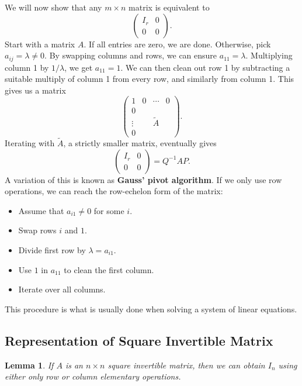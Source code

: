 \documentclass[12pt]{article}
\newtheorem{lemma}{Lemma}[section]
\theoremstyle{definition}
\theoremstyle{remark}
\begin{document}
We will now show that any $m \times n$ matrix is equivalent to
\[
\begin{pmatrix}
	I_r & 0 \\
	0 & 0
\end{pmatrix}
.\]
Start with a matrix $A$. If all entries are zero, we are done. Otherwise, pick $a_{ij} = \lambda \neq 0$. By swapping columns and rows, we can ensure $a_{11} = \lambda$. Multiplying column 1 by $1/\lambda$, we get $a_{11} = 1$. We can then clean out row 1 by subtracting a suitable multiply of column 1 from every row, and similarly from column 1. This gives us a matrix
\[
\begin{pmatrix}
	1 & 0 & \cdots & 0 \\
	0 & & & \\
	\vdots & & \tilde A & \\
	0 & & &
\end{pmatrix}
.\]
Iterating with $\tilde A$, a strictly smaller matrix, eventually gives
\[
\begin{pmatrix}
	I_r & 0 \\
	0 & 0
\end{pmatrix} = Q^{-1}AP
.\]
A variation of this is known as \textbf{Gauss' pivot algorithm}. If we only use row operations, we can reach the row-echelon form of the matrix:
\begin{itemize}
	\item Assume that $a_{i1} \neq 0$ for some $i$.
	\item Swap rows $i$ and $1$.
	\item Divide first row by $\lambda = a_{i1}$.
	\item Use $1$ in $a_{11}$ to clean the first column.
	\item Iterate over all columns.
\end{itemize}
This procedure is what is usually done when solving a system of linear equations.

\subsection{Representation of Square Invertible Matrix}%
\label{sub:representation_of_square_invertible_matrix}

\begin{lemma}
	If $A$ is an $n \times n$ square invertible matrix, then we can obtain $I_n$ using either only row or column elementary operations.
\end{lemma}
\end{document}
